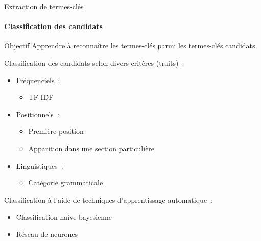   \begin{frame}{Extraction de termes-clés}\framesubtitle{Classification des candidats}
    \begin{block}{Objectif}
      Apprendre à reconnaître les termes-clés parmi les termes-clés candidats.
    \end{block}

    \vspace{1em}

    Classification des candidats selon divers critères (traits)~:
    \begin{itemize}
      \item{Fréquenciels~:}
      \begin{itemize}
        \item{TF-IDF~\cite[KEA]{witten1999kea}}
      \end{itemize}
      \item{Positionnels~:}
      \begin{itemize}
        \item{Première position~\cite[KEA]{witten1999kea}}
        \item{Apparition dans une section
              particulière~\cite{nguyen2007keadocumentstructure}}
      \end{itemize}
      \item{Linguistiques~:}
      \begin{itemize}
        \item{Catégorie grammaticale~\cite{nguyen2007keadocumentstructure}}
      \end{itemize}
    \end{itemize}

    \vspace{1em}

    Classification à l'aide de techniques d'apprentissage automatique~:
    \begin{itemize}
      \item{Classification naîve bayesienne~\cite[KEA]{witten1999kea}}
      \item{Réseau de neurones~\cite{sarkar2010neuralnetwork}}
    \end{itemize}
  \end{frame}

